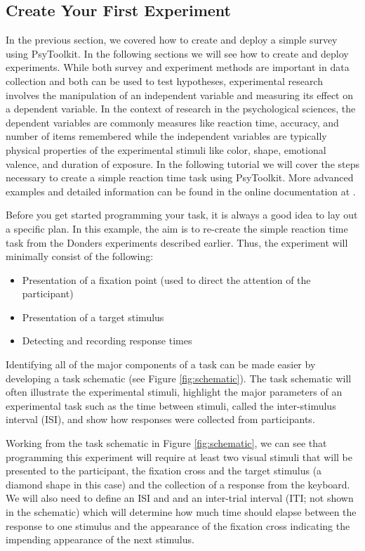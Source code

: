 \subsection{Create Your First Experiment}
In the previous section, we covered how to create and deploy a simple survey using PsyToolkit. In the following sections we will see how to create and deploy experiments. While both survey and experiment methods are important in data collection and both can be used to test hypotheses, experimental research involves the manipulation of an independent variable and measuring its effect on a dependent variable.  In the context of research in the psychological sciences, the dependent variables are commonly measures like reaction time, accuracy, and number of items remembered while the independent variables are typically physical properties of the experimental stimuli like color, shape, emotional valence, and duration of exposure. In the following tutorial we will cover the steps necessary to create a simple reaction time task using PsyToolkit.  More advanced examples and detailed information can be found in the online documentation at .

Before you get started programming your task, it is always a good idea to lay out a specific plan. In this example, the aim is to re-create the simple reaction time task from the Donders experiments described earlier.  Thus, the experiment will minimally consist of the following: \begin{itemize} \item Presentation of  a fixation point (used to direct the attention of the participant) \item Presentation of a target stimulus \item Detecting and recording response times \end{itemize}  Identifying all of the major components of a task can be made easier by developing a \gls{task schematic} (see Figure \ref{fig:schematic}).  The task schematic will often illustrate the experimental stimuli, highlight the major parameters of an experimental task such as the time between stimuli, called the \gls{inter-stimulus interval} (ISI), and show how responses were collected from participants.

Working from the task schematic in Figure \ref{fig:schematic}, we can see that programming this experiment will require  at least two visual stimuli that will be presented to the participant, the fixation cross and the target stimulus (a diamond shape in this case) and the collection of a response from the keyboard.  We will also need to define an ISI and and an \gls{inter-trial interval} (ITI; not shown in the schematic) which will determine how much time should elapse between the response to one stimulus and the appearance of the fixation cross indicating the impending appearance of the next stimulus.

